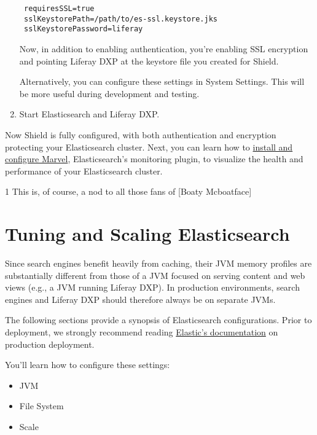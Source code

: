 \begin{enumerate}
\begin{verbatim}
 requiresSSL=true
 sslKeystorePath=/path/to/es-ssl.keystore.jks
 sslKeystorePassword=liferay
\end{verbatim}

  Now, in addition to enabling authentication, you're enabling SSL
  encryption and pointing Liferay DXP at the keystore file you created
  for Shield.

  Alternatively, you can configure these settings in System Settings.
  This will be more useful during development and testing.
\item
  Start Elasticsearch and Liferay DXP.
\end{enumerate}

Now Shield is fully configured, with both authentication and encryption
protecting your Elasticsearch cluster. Next, you can learn how to
\href{/docs/7-0/deploy/-/knowledge_base/d/monitoring-elasticsearch-with-marvel}{install
and configure Marvel}, Elasticsearch's monitoring plugin, to visualize
the health and performance of your Elasticsearch cluster.

1 This is, of course, a nod to all those fans of {[}Boaty Mcboatface{]}

\section{Tuning and Scaling
Elasticsearch}\label{tuning-and-scaling-elasticsearch}

Since search engines benefit heavily from caching, their JVM memory
profiles are substantially different from those of a JVM focused on
serving content and web views (e.g., a JVM running Liferay DXP). In
production environments, search engines and Liferay DXP should therefore
always be on separate JVMs.

The following sections provide a synopsis of Elasticsearch
configurations. Prior to deployment, we strongly recommend reading
\href{https://www.elastic.co/guide/en/elasticsearch/guide/current/index.html}{Elastic's
documentation} on production deployment.

You'll learn how to configure these settings:

\begin{itemize}
\tightlist
\item
  JVM
\item
  File System
\item
  Scale
\end{itemize}

